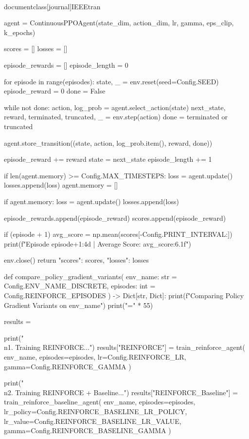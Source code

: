 \\documentclass[journal]{IEEEtran}
\begin{document}
    agent = ContinuousPPOAgent(state_dim, action_dim, lr, gamma, eps_clip, k_epochs)

    scores = []
    losses = []

    episode_rewards = []
    episode_length = 0

    for episode in range(episodes):
        state, _ = env.reset(seed=Config.SEED)
        episode_reward = 0
        done = False

        while not done:
            action, log_prob = agent.select_action(state)
            next_state, reward, terminated, truncated, _ = env.step(action)
            done = terminated or truncated

            agent.store_transition((state, action, log_prob.item(), reward, done))

            episode_reward += reward
            state = next_state
            episode_length += 1

            if len(agent.memory) >= Config.MAX_TIMESTEPS:
                loss = agent.update()
                losses.append(loss)
                agent.memory = []

        if agent.memory:
            loss = agent.update()
            losses.append(loss)

        episode_rewards.append(episode_reward)
        scores.append(episode_reward)

        if (episode + 1) %
            avg_score = np.mean(scores[-Config.PRINT_INTERVAL:])
            print(f"Episode {episode+1:4d} | Average Score: {avg_score:6.1f}")

    env.close()
    return {"scores": scores, "losses": losses}


def compare_policy_gradient_variants(
    env_name: str = Config.ENV_NAME_DISCRETE, episodes: int = Config.REINFORCE_EPISODES
) -> Dict[str, Dict]:
    print(f"Comparing Policy Gradient Variants on {env_name}")
    print("=" * 55)

    results = {}

    print("\\n1. Training REINFORCE...")
    results["REINFORCE"] = train_reinforce_agent(
        env_name, episodes=episodes, lr=Config.REINFORCE_LR, gamma=Config.REINFORCE_GAMMA
    )

    print("\\n2. Training REINFORCE + Baseline...")
    results["REINFORCE_Baseline"] = train_reinforce_baseline_agent(
        env_name, episodes=episodes, lr_policy=Config.REINFORCE_BASELINE_LR_POLICY, lr_value=Config.REINFORCE_BASELINE_LR_VALUE, gamma=Config.REINFORCE_BASELINE_GAMMA
    )
\end{document}
